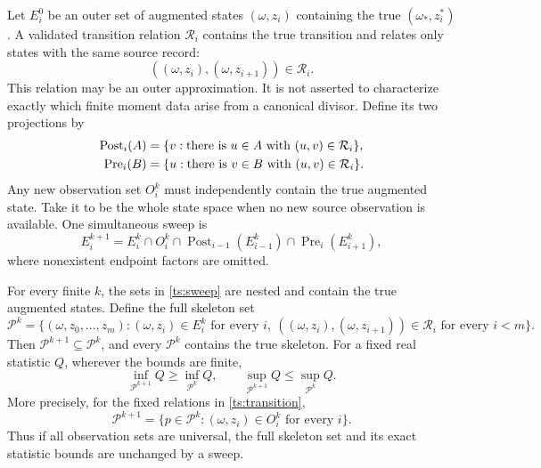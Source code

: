 Let $E_i^0$ be an outer set of augmented states $(\omega,z_i)$ containing
the true $(\omega_*,z_i^*)$. A validated transition relation
$\mathcal R_i$ contains the true transition and relates only states with
the same source record:
\begin{equation}
 ((\omega,z_i),(\omega,z_{i+1}))\in\mathcal R_i.
 \label{ts:transition}
\end{equation}
This relation may be an outer approximation. It is not asserted to
characterize exactly which finite moment data arise from a canonical
divisor. Define its two projections by
\begin{align}
 \operatorname{Post}_i(A)
 &=\{v:\text{there is }u\in A\text{ with }(u,v)\in\mathcal R_i\},
 \notag\\
 \operatorname{Pre}_i(B)
 &=\{u:\text{there is }v\in B\text{ with }(u,v)\in\mathcal R_i\}.
 \label{ts:projections}
\end{align}
Any new observation set $O_i^k$ must independently contain the true
augmented state. Take it to be the whole state space when no new source
observation is available. One simultaneous sweep is
\begin{equation}
 E_i^{k+1}=E_i^k\cap O_i^k
       \cap\operatorname{Post}_{i-1}(E_{i-1}^k)
       \cap\operatorname{Pre}_{i}(E_{i+1}^k),
 \label{ts:sweep}
\end{equation}
where nonexistent endpoint factors are omitted.

\begin{proposition}\label{ts:sound}
For every finite $k$, the sets in \eqref{ts:sweep} are nested and contain
the true augmented states. Define the full skeleton set
\begin{equation}
 \mathcal P^k=\{(\omega,z_0,\ldots,z_m):
       (\omega,z_i)\in E_i^k\text{ for every }i,
       \ ((\omega,z_i),(\omega,z_{i+1}))\in\mathcal R_i
                         \text{ for every }i<m\}.
 \label{ts:skeleton}
\end{equation}
Then $\mathcal P^{k+1}\subseteq\mathcal P^k$, and every $\mathcal P^k$
contains the true skeleton. For a fixed real statistic $Q$, wherever
the bounds are finite,
\begin{equation}
 \inf_{\mathcal P^{k+1}}Q\ge\inf_{\mathcal P^k}Q,
 \qquad
 \sup_{\mathcal P^{k+1}}Q\le\sup_{\mathcal P^k}Q.
 \label{ts:monotone-bounds}
\end{equation}
More precisely, for the fixed relations in \eqref{ts:transition},
\begin{equation}
 \mathcal P^{k+1}=\{p\in\mathcal P^k:
           (\omega,z_i)\in O_i^k\text{ for every }i\}.
 \label{ts:skeleton-invariance}
\end{equation}
Thus if all observation sets are universal, the full skeleton set and
its exact statistic bounds are unchanged by a sweep.
\end{proposition}

